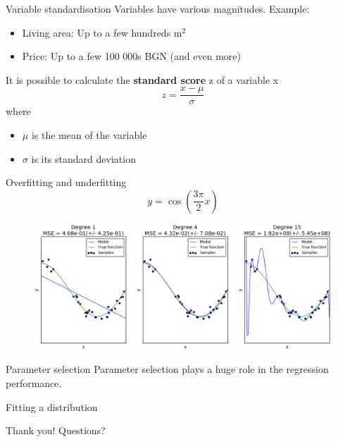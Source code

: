 \documentclass{beamer}
\begin{document}
\begin{frame}{Variable standardisation}
Variables have various magnitudes. Example:
\begin{itemize}
	\item Living area: Up to a few hundreds m$^2$
	\item Price: Up to a few 100 000s BGN (and even more)
\end{itemize}
\vfill
\pause
It is possible to calculate the \textbf{standard score} z of a variable x
$$ z = \dfrac{x - \mu}{\sigma}$$
where
\begin{itemize}
	\item $\mu$ is the mean of the variable
	\item $\sigma$ is its standard deviation
\end{itemize}
\end{frame}

\begin{frame}{Overfitting and underfitting }
$$ y = \cos \left( \dfrac{3\pi}{2} x \right) $$
\begin{figure}
\centering
\includegraphics[width=\textwidth]{images/over_under_fitting.png}
\end{figure}
\end{frame}

\begin{frame}{Parameter selection}
Parameter selection plays a huge role in the regression performance.
\end{frame}

\begin{frame}{Fitting a distribution}

\end{frame}

\begin{frame}
\begin{center}
\Huge{Thank you! Questions?}
\end{center}
\end{frame}
\end{document}
